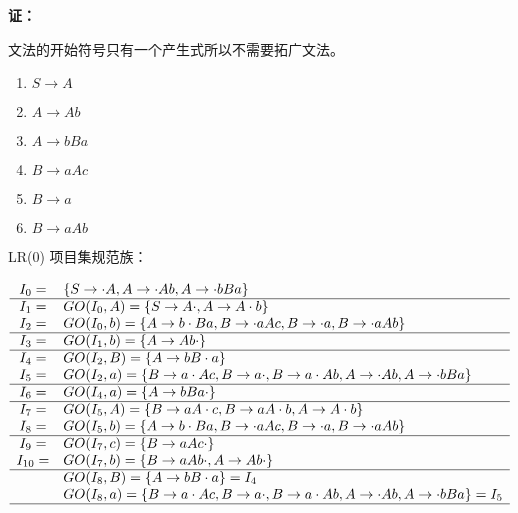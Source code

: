 \begin{enumerate}
    \textbf{证：}
    
    文法的开始符号只有一个产生式所以不需要拓广文法。
    
    \begin{enumerate}[(1)]
        \item $S \to A$
        \item $A \to Ab$
        \item $A \to bBa$
        \item $B \to aAc$
        \item $B \to a$
        \item $B \to aAb$
    \end{enumerate}
    
    LR(0) 项目集规范族：
    
    \begin{equation*}
        \begin{array}{cl}
            I_0 = & \{S \to \cdot A, A \to \cdot Ab, A \to \cdot bBa\} \\
            \hline
            I_1 = & GO(I_0, A) = \{S \to A \cdot, A \to A \cdot b \} \\
            I_2 = & GO(I_0, b) = \{A \to b \cdot Ba, B \to \cdot aAc, B \to \cdot a, B \to \cdot aAb \}\\
            \hline
            I_3 = & GO(I_1, b) = \{A \to Ab \cdot\} \\
            \hline
            I_4 = & GO(I_2, B) = \{A \to bB \cdot a\} \\
            I_5 = & GO(I_2, a) = \{B \to a \cdot Ac, B \to a \cdot, B \to a \cdot Ab, A \to \cdot Ab, A \to \cdot bBa\} \\
            \hline
            I_6 = & GO(I_4, a) = \{A \to bBa \cdot \} \\
            \hline
            I_7 = & GO(I_5, A) = \{B \to aA \cdot c, B \to aA \cdot b, A \to A \cdot b \} \\
            I_8 = & GO(I_5, b) = \{A \to b \cdot Ba, B \to \cdot aAc, B \to \cdot a, B \to \cdot aAb \} \\
            \hline
            I_9 = & GO(I_7, c) = \{B \to aAc \cdot\} \\
            I_{10} = & GO(I_7, b) = \{B \to aAb \cdot, A \to Ab \cdot\} \\
            \hline
                  & GO(I_8, B) = \{A \to bB \cdot a\} = I_4 \\
                  & GO(I_8, a) = \{B \to a \cdot Ac, B \to a \cdot, B \to a \cdot Ab, A \to \cdot Ab, A \to \cdot bBa\} = I_5 \\
            \hline
        \end{array}
    \end{equation*}
    

\end{enumerate}
